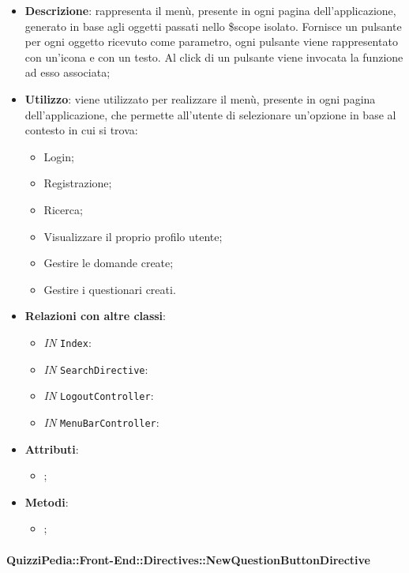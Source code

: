 \begin{itemize}
	\item \textbf{Descrizione}: rappresenta il menù, presente in ogni pagina dell'applicazione, generato in base agli oggetti passati nello \$scope isolato. Fornisce un pulsante per ogni oggetto ricevuto come parametro, ogni pulsante viene rappresentato con un’icona e con un testo. Al click di un pulsante viene invocata la funzione ad esso associata;
	\item \textbf{Utilizzo}: viene utilizzato per realizzare il menù, presente in ogni pagina dell'applicazione, che permette all'utente di selezionare un'opzione in base al contesto in cui si trova:
		\begin{itemize}
			\item Login;
			\item Registrazione;
			\item Ricerca;
			\item Visualizzare il proprio profilo utente;
			\item Gestire le domande create;
			\item Gestire i questionari creati.
		\end{itemize}
	\item \textbf{Relazioni con altre classi}: 
	\begin{itemize}
		\item \textit{IN} \texttt{Index}: 
		\item \textit{IN} \texttt{SearchDirective}: 
		\item \textit{IN} \texttt{LogoutController}: 
		\item \textit{IN} \texttt{MenuBarController}: 
	\end{itemize}
	\item \textbf{Attributi}: 
	\begin{itemize}
		\item ;
	\end{itemize}
	\item \textbf{Metodi}: 
	\begin{itemize}
		\item ;
	\end{itemize}
\end{itemize}

\paragraph{QuizziPedia::Front-End::Directives::NewQuestionButtonDirective}

\label{QuizziPedia::Front-End::Directives::NewQuestionButtonDirective}

